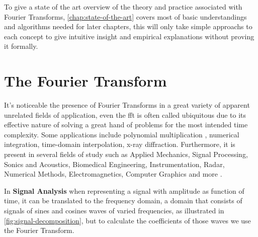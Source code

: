 \documentclass[
  oneside,
  11pt, a4paper,
  footinclude=true,
  headinclude=true,
  cleardoublepage=empty
]{scrbook}
\begin{document}
To give a state of the art overview of the theory and practice associated with Fourier Transforms, \autoref{chap:state-of-the-art} covers most of basic understandings and algorithms needed for later chapters, this will only take simple approachs to each concept to give intuitive insight and empirical explanations without proving it formally.





\chapter{The Fourier Transform} \label{chap:state-of-the-art}

It's noticeable the presence of Fourier Transforms in a great variety of apparent unrelated fields of application, even the \acrshort{fft} is often called ubiquitous due to its effective nature of solving a great hand of problems for the most intended time complexity. Some applications include polynomial multiplication \cite{jia2014polynomial}, numerical integration, time-domain interpolation, x-ray diffraction. Furthermore, it is present in several fields of study such as Applied Mechanics, Signal Processing, Sonics and Acoustics, Biomedical Engineering, Instrumentation, Radar, Numerical Methods, Electromagnetics, Computer Graphics and more \cite{brigham1988fast}.

In \textbf{Signal Analysis} when representing a signal with amplitude as function of time, it can be translated to the frequency domain, a domain that consists of signals of sines and cosines waves of varied frequencies, as illustrated in \autoref{fig:signal-decomposition}, but to calculate the coefficients of those waves we use the Fourier Transform.
\end{document}
